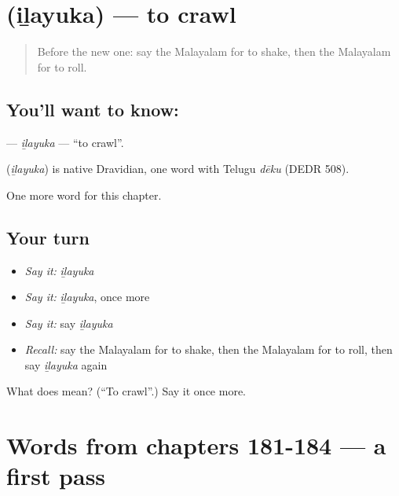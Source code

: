 \section[\texorpdfstring{\ml{ഇഴയുക} (iḻayuka)}{ഇഴയുക (iḻayuka)}]{ (iḻayuka) — to crawl}

\label{lesson:ML-C189-ilayuka}



\begin{quote}
Before the new one: say the Malayalam for to shake, then the Malayalam for to roll.
\end{quote}

\subsection*{You'll want to know: }
\textbf{} — \emph{iḻayuka} — \textquotedblleft{}to crawl\textquotedblright{}.

\begin{cousinweb}
\textbf{} (\emph{iḻayuka}) is native Dravidian, one word with Telugu \emph{dēku} (DEDR 508).
\end{cousinweb}

\begin{grammarlens}[title={What you've built}]
One more word for this chapter.
\end{grammarlens}

\subsection*{Your turn}
\begin{itemize}
\raggedright
  \item \emph{Say it:} \emph{iḻayuka}
  \item \emph{Say it:} \emph{iḻayuka}, once more
  \item \emph{Say it:} say \emph{iḻayuka}
  \item \emph{Recall:} say the Malayalam for to shake, then the Malayalam for to roll, then say \emph{iḻayuka} again
\end{itemize}

\begin{tcolorbox}[breakable,colback=teal!4,colframe=teal!35!black,title={Before you move on}]
What does  mean? (\textquotedblleft{}To crawl\textquotedblright{}.) Say it once more.
\end{tcolorbox}
\section[(dialogue)]{Words from chapters 181-184 — a first pass}


